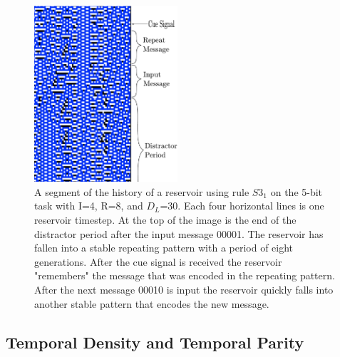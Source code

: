 \documentclass{elsarticle}
\begin{document}
\begin{multicols}{2}
\begin{figure}[H]
\centering
\includegraphics[width=0.475\textwidth]{RepeatMessage.pdf}
\caption{A segment of the history of a reservoir using rule $S3_{1}$ on the 
   5-bit task with I=4, R=8, and $D_{L}$=30. Each four horizontal lines is one 
      reservoir timestep. At the top of the image is the end of the distractor 
      period after the input message 00001. The reservoir has fallen into a 
      stable repeating pattern with a period of eight generations. After the 
      cue signal is received the reservoir "remembers" the message that was 
      encoded in the repeating pattern. After the next message 00010 is input 
      the reservoir quickly falls into another stable pattern that encodes the 
      new message.} 
        
\label{repeat}
\end{figure}

\subsection{Temporal Density and Temporal Parity}

\iffalse


\end{multicols}
\end{document}
